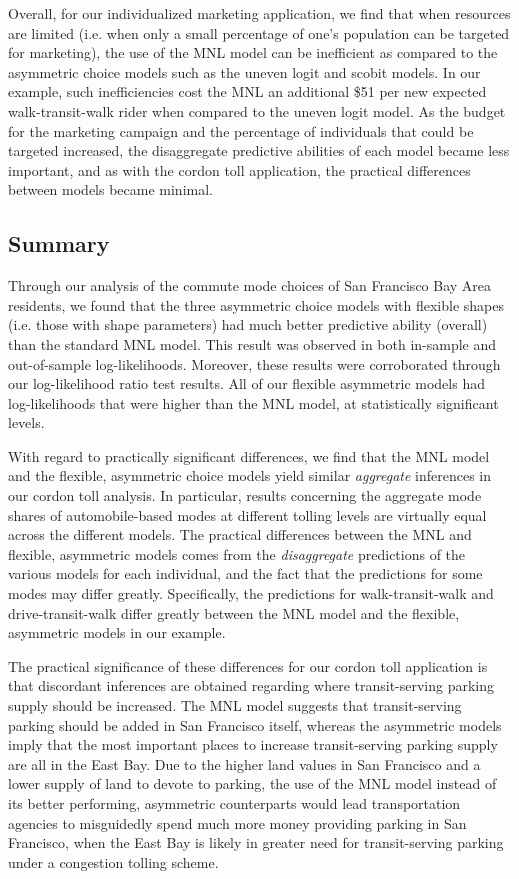 Overall, for our individualized marketing application, we find that when resources are limited (i.e. when only a small percentage of one's population can be targeted for marketing), the use of the MNL model can be inefficient as compared to the asymmetric choice models such as the uneven logit and scobit models. In our example, such inefficiencies cost the MNL an additional \$51 per new expected walk-transit-walk rider when compared to the uneven logit model. As the budget for the marketing campaign and the percentage of individuals that could be targeted increased, the disaggregate predictive abilities of each model became less important, and as with the cordon toll application, the practical differences between models became minimal.


\subsection{Summary}
Through our analysis of the commute mode choices of San Francisco Bay Area residents, we found that the three asymmetric choice models with flexible shapes (i.e. those with shape parameters) had much better predictive ability (overall) than the standard MNL model. This result was observed in both in-sample and out-of-sample log-likelihoods. Moreover, these results were corroborated through our log-likelihood ratio test results. All of our flexible asymmetric models had log-likelihoods that were higher than the MNL model, at statistically significant levels.

With regard to practically significant differences, we find that the MNL model and the flexible, asymmetric choice models yield similar \textit{aggregate} inferences in our cordon toll analysis. In particular, results concerning the aggregate mode shares of automobile-based modes at different tolling levels are virtually equal across the different models. The practical differences between the MNL and flexible, asymmetric models comes from the \textit{disaggregate} predictions of the various models for each individual, and the fact that the predictions for some modes may differ greatly. Specifically, the predictions for walk-transit-walk and drive-transit-walk differ greatly between the MNL model and the flexible, asymmetric models in our example. 

The practical significance of these differences for our cordon toll application is that discordant inferences are obtained regarding where transit-serving parking supply should be increased. The MNL model suggests that transit-serving parking should be added in San Francisco itself, whereas the asymmetric models imply that the most important places to increase transit-serving parking supply are all in the East Bay. Due to the higher land values in San Francisco and a lower supply of land to devote to parking, the use of the MNL model instead of its better performing, asymmetric counterparts would lead transportation agencies to misguidedly spend much more money providing parking in San Francisco, when the East Bay is likely in greater need for transit-serving parking under a congestion tolling scheme.

